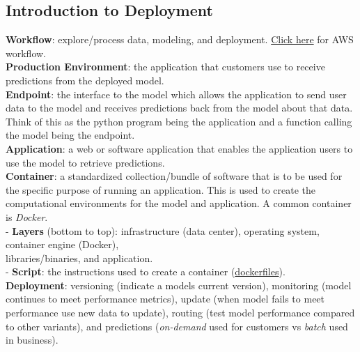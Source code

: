 \documentclass[11pt, a4paper]{article}
\begin{document}
\begin{spacing}{1.1}
	\subsection{Introduction to Deployment}
	\textbf{Workflow}: explore/process data, modeling, and deployment. \href{https://docs.aws.amazon.com/sagemaker/latest/dg/how-it-works-mlconcepts.html}{Click here} for AWS workflow.\vspace*{2mm}\\
	\textbf{Production Environment}: the application that customers use to receive predictions from the deployed model.\vspace*{2mm}\\
	\textbf{Endpoint}: the interface to the model which allows the application to send user data to the model and receives predictions back from the model about that data. Think of this as the python program being the application and a function calling the model being the endpoint. \vspace*{2mm}\\
	\textbf{Application}: a web or software application that enables the application users to use the model to retrieve predictions. \vspace*{2mm}\\
	\textbf{Container}: a standardized collection/bundle of software that is to be used for the specific purpose of running an application. This is used to create the computational environments for the model and application. A common container is \textit{Docker}. \\
	\hspace*{3mm} - \textbf{Layers} (bottom to top): infrastructure (data center), operating system, container engine (Docker), \\ \hspace*{6mm} libraries/binaries, and application. \\
	\hspace*{3mm} - \textbf{Script}: the instructions used to create a container (\href{https://hub.docker.com/search?q=&type=image}{dockerfiles}). \vspace*{2mm}\\
	\textbf{Deployment}: versioning (indicate a models current version), monitoring (model continues to meet performance metrics), update (when model fails to meet performance use new data to update), routing (test model performance compared to other variants), and predictions (\textit{on-demand} used for customers vs \textit{batch} used in business).\vspace*{2mm}
	

\end{spacing}
\end{document}
